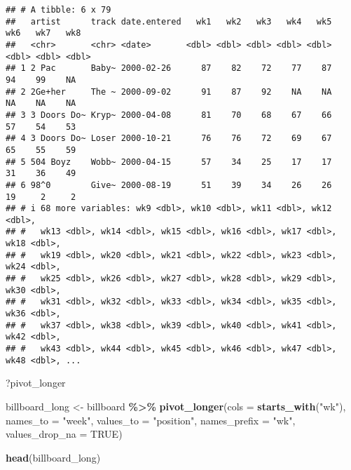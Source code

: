 \documentclass[
]{article}
\newenvironment{Shaded}{\begin{snugshade}}{\end{snugshade}}
\newcommand{\AttributeTok}[1]{\textcolor[rgb]{0.13,0.29,0.53}{#1}}
\newcommand{\ConstantTok}[1]{\textcolor[rgb]{0.56,0.35,0.01}{#1}}
\newcommand{\FunctionTok}[1]{\textcolor[rgb]{0.13,0.29,0.53}{\textbf{#1}}}
\newcommand{\NormalTok}[1]{#1}
\newcommand{\OtherTok}[1]{\textcolor[rgb]{0.56,0.35,0.01}{#1}}
\newcommand{\SpecialCharTok}[1]{\textcolor[rgb]{0.81,0.36,0.00}{\textbf{#1}}}
\newcommand{\StringTok}[1]{\textcolor[rgb]{0.31,0.60,0.02}{#1}}
\begin{document}
\begin{verbatim}
## # A tibble: 6 x 79
##   artist      track date.entered   wk1   wk2   wk3   wk4   wk5   wk6   wk7   wk8
##   <chr>       <chr> <date>       <dbl> <dbl> <dbl> <dbl> <dbl> <dbl> <dbl> <dbl>
## 1 2 Pac       Baby~ 2000-02-26      87    82    72    77    87    94    99    NA
## 2 2Ge+her     The ~ 2000-09-02      91    87    92    NA    NA    NA    NA    NA
## 3 3 Doors Do~ Kryp~ 2000-04-08      81    70    68    67    66    57    54    53
## 4 3 Doors Do~ Loser 2000-10-21      76    76    72    69    67    65    55    59
## 5 504 Boyz    Wobb~ 2000-04-15      57    34    25    17    17    31    36    49
## 6 98^0        Give~ 2000-08-19      51    39    34    26    26    19     2     2
## # i 68 more variables: wk9 <dbl>, wk10 <dbl>, wk11 <dbl>, wk12 <dbl>,
## #   wk13 <dbl>, wk14 <dbl>, wk15 <dbl>, wk16 <dbl>, wk17 <dbl>, wk18 <dbl>,
## #   wk19 <dbl>, wk20 <dbl>, wk21 <dbl>, wk22 <dbl>, wk23 <dbl>, wk24 <dbl>,
## #   wk25 <dbl>, wk26 <dbl>, wk27 <dbl>, wk28 <dbl>, wk29 <dbl>, wk30 <dbl>,
## #   wk31 <dbl>, wk32 <dbl>, wk33 <dbl>, wk34 <dbl>, wk35 <dbl>, wk36 <dbl>,
## #   wk37 <dbl>, wk38 <dbl>, wk39 <dbl>, wk40 <dbl>, wk41 <dbl>, wk42 <dbl>,
## #   wk43 <dbl>, wk44 <dbl>, wk45 <dbl>, wk46 <dbl>, wk47 <dbl>, wk48 <dbl>, ...
\end{verbatim}

\begin{Shaded}
\begin{Highlighting}[]
\NormalTok{?pivot\_longer}
\end{Highlighting}
\end{Shaded}

\begin{Shaded}
\begin{Highlighting}[]
\NormalTok{billboard\_long }\OtherTok{\textless{}{-}}\NormalTok{ billboard }\SpecialCharTok{\%\textgreater{}\%}
\FunctionTok{pivot\_longer}\NormalTok{(}\AttributeTok{cols =} \FunctionTok{starts\_with}\NormalTok{(}\StringTok{"wk"}\NormalTok{),}
             \AttributeTok{names\_to =} \StringTok{"week"}\NormalTok{,}
             \AttributeTok{values\_to =} \StringTok{"position"}\NormalTok{,}
             \AttributeTok{names\_prefix =} \StringTok{"wk"}\NormalTok{, }
             \AttributeTok{values\_drop\_na =} \ConstantTok{TRUE}\NormalTok{)}
\end{Highlighting}
\end{Shaded}

\begin{Shaded}
\begin{Highlighting}[]
\FunctionTok{head}\NormalTok{(billboard\_long)}
\end{Highlighting}
\end{Shaded}
\end{document}
